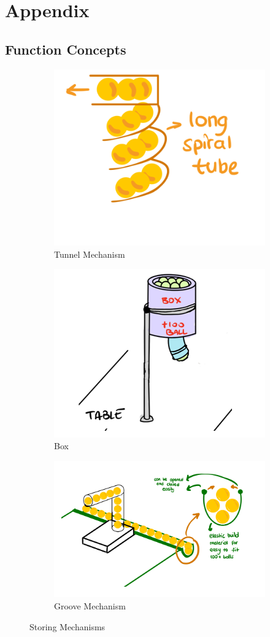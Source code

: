 \documentclass[12pt]{article}
\begin{document}
\section{Appendix}
\subsection{Function Concepts}

\begin{figure}[H]
\centering
\begin{subfigure}{.3\textwidth}
  \centering
  \includegraphics[width=.3\linewidth]{Function photos/Tunnel.png}
  \caption{Tunnel Mechanism}
  \label{fig:tunnel_mechanism}
\end{subfigure}%
\begin{subfigure}{.3\textwidth}
  \centering
  \includegraphics[width=.3\linewidth]{Function photos/box.png}
  \caption{Box}
  \label{fig:box}
\end{subfigure}
\begin{subfigure}{.3\textwidth}
  \centering
  \includegraphics[width=.3\linewidth]{Function photos/groove.png}
  \caption{Groove Mechanism}
  \label{fig:groove_mechanism}
\end{subfigure}%
\caption{Storing Mechanisms}
\label{fig:storing_mechanism}
\end{figure}
\end{document}
